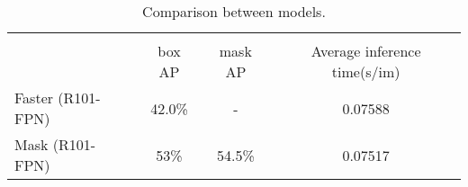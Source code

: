 \documentclass[12pt, onside]{article}
\begin{document}
\begin{table}[h]
\begin{center} {
\begin{tabular}{lccc}
\hline 
& \multicolumn{3}{c}{}  \\[0.5 pt]
& \multicolumn{1}{c}{box AP} & \multicolumn{1}{c}{mask AP} & \multicolumn{1}{c}{Average inference time(s/im)}\\
{Faster (R101-FPN)} & 42.0\% & - & 0.07588\\[1ex]
{Mask (R101-FPN) } & 53\% & 54.5\% & 0.07517\\[1ex]
\hline 
\end{tabular}}
\end{center}
\caption{Comparison between models.}
\label{tab:com}
\end{table}
\newpage
\begin{table}[t]
\centering
{}
\caption{Adaptive Table}
\label{tab:aaaa}
\end{table}
\end{document}
